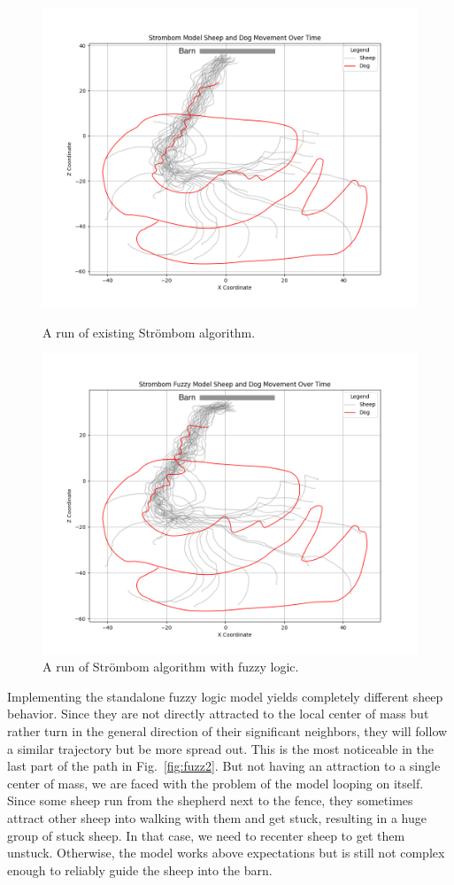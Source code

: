 \documentclass[9pt]{pnas-new}
\begin{document}
\begin{figure}[h]
  \begin{minipage}{0.5\textwidth}
    \centering
    \includegraphics[width=0.8\linewidth]{fig/strombom_graph.png}
    \caption{\label{fig:holA}A run of existing Str\"{o}mbom algorithm.}
    \label{img1}
  \end{minipage}%
  \begin{minipage}{0.5\textwidth}
    \centering
    \includegraphics[width=0.8\linewidth]{fig/Stormbom_fuzzy2.png}
    \caption{\label{fig:holB} A run of Str\"{o}mbom algorithm with fuzzy logic.}
    \label{img2}
  \end{minipage}
\end{figure}

Implementing the standalone fuzzy logic model yields completely different sheep behavior. Since they are not directly attracted to the local center of mass but rather turn in the general direction of their significant neighbors, they will follow a similar trajectory but be more spread out. This is the most noticeable in the last part of the path in Fig.~\ref{fig:fuzz2}. But not having an attraction to a single center of mass, we are faced with the problem of the model looping on itself. Since some sheep run from the shepherd next to the fence, they sometimes attract other sheep into walking with them and get stuck, resulting in a huge group of stuck sheep. In that case, we need to recenter sheep to get them unstuck. Otherwise, the model works above expectations but is still not complex enough to reliably guide the sheep into the barn. 
\end{document}
